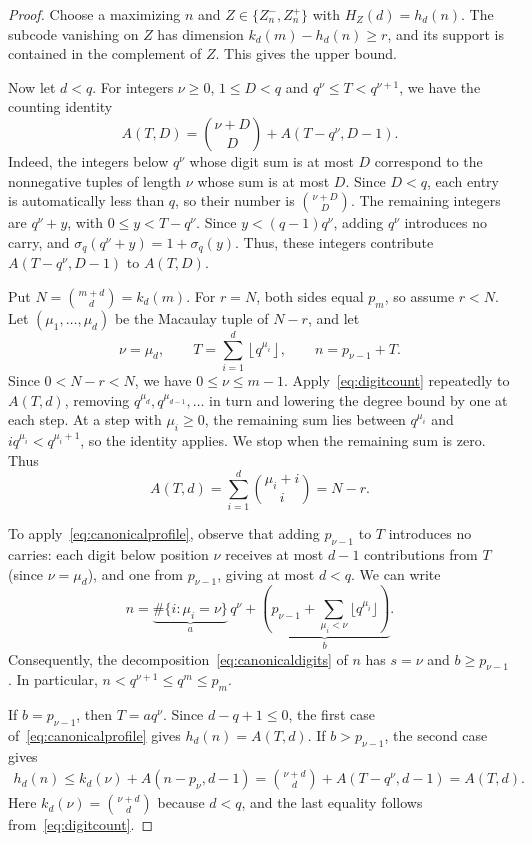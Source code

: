 \documentclass[11pt]{amsart}
\theoremstyle{definition}
\newcommand{\sq}[1]{\left\lfloor q^{#1}\right\rfloor}
\numberwithin{equation}{section}
\begin{document}
\begin{proof}
Choose a maximizing $n$ and
$Z\in\{Z_n^-,Z_n^+\}$ with $H_Z(d)=h_d(n)$.
The subcode vanishing on $Z$ has dimension
$k_d(m)-h_d(n)\ge r$, and its support is contained in the
complement of $Z$. This gives the upper bound.

Now let $d<q$. For integers $\nu\ge0$, $1\le D<q$
and $q^\nu\le T<q^{\nu+1}$, we have the counting identity
\begin{equation}\label{eq:digitcount}
 A(T,D)=\binom{\nu+D}{D}+A(T-q^\nu,D-1).
\end{equation}
Indeed, the integers below $q^\nu$ whose digit sum is at most $D$
correspond to the nonnegative tuples of length $\nu$ whose sum
is at most $D$. Since $D<q$, each entry is automatically less
than $q$, so their number is $\binom{\nu+D}{D}$.
The remaining integers are $q^\nu+y$, with $0\le y<T-q^\nu$.
Since $y<(q-1)q^\nu$, adding $q^\nu$ introduces no carry, and
$\sigma_q(q^\nu+y)=1+\sigma_q(y)$. Thus, these integers contribute
$A(T-q^\nu,D-1)$ to $A(T,D)$.

Put $N=\binom{m+d}{d}=k_d(m)$. For $r=N$, both sides equal $p_m$, so assume $r<N$. Let $(\mu_1,\ldots,\mu_d)$ be the Macaulay tuple
of $N-r$, and let
\[
 \nu=\mu_d,\qquad T=\sum_{i=1}^d\sq{\mu_i},\qquad
 n=p_{\nu-1}+T.
\]
Since $0<N-r<N$, we have $0\le\nu\le m-1$.
Apply~\eqref{eq:digitcount} repeatedly to $A(T,d)$,
removing $q^{\mu_d},q^{\mu_{d-1}},\ldots$ in turn and lowering
the degree bound by one at each step.
At a step with $\mu_i\ge0$,
the remaining sum lies between $q^{\mu_i}$ and
$i q^{\mu_i}<q^{\mu_i+1}$, so the identity applies.
We stop when the remaining sum is zero. Thus
\[
 A(T,d)=\sum_{i=1}^d\binom{\mu_i+i}{i}=N-r.
\]

To apply~\eqref{eq:canonicalprofile}, observe that adding
$p_{\nu-1}$ to $T$ introduces no carries: each digit below
position $\nu$ receives at most $d-1$ contributions from $T$ (since $\nu=\mu_d$),
and one from $p_{\nu-1}$, giving at most $d<q$. We can write 
\[
n=
\underbrace{\#\{i:\mu_i=\nu\}}_{a}\,q^\nu
+
\underbrace{\left(
p_{\nu-1}+\sum_{\mu_i<\nu}\lfloor q^{\mu_i}\rfloor
\right)}_{b}.
\]
Consequently, the decomposition~\eqref{eq:canonicaldigits} of $n$
has $s=\nu$ and $b\ge p_{\nu-1}$.
In particular, $n<q^{\nu+1}\le q^m\le p_m$.

If $b=p_{\nu-1}$, then $T=aq^\nu$.
Since $d-q+1\le0$, the first case of~\eqref{eq:canonicalprofile}
gives $h_d(n)=A(T,d)$.
If $b>p_{\nu-1}$, the second case gives
\[
 \begin{aligned}
 h_d(n)
 \le k_d(\nu)+A(n-p_\nu,d-1)
 =\binom{\nu+d}{d}+A(T-q^\nu,d-1)
 =A(T,d).
 \end{aligned}
\]
Here $k_d(\nu)=\binom{\nu+d}{d}$ because $d<q$, and the last
equality follows from~\eqref{eq:digitcount}.


\end{proof}
\end{document}
